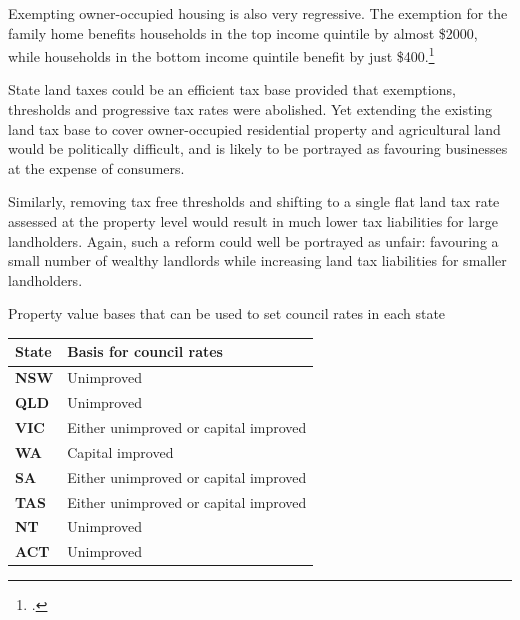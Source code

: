 \documentclass[twoside,english]{palatinob5portrait}
\begin{document}
Exempting owner-occupied housing is also very regressive. The exemption for the family home benefits households in the top income quintile by almost \$2000, while households in the bottom income quintile benefit by just \$400.\footcite[][27]{KellyMaresHarrisonEtAl2013}   

State land taxes could be an efficient tax base provided that exemptions, thresholds and progressive tax rates were abolished. Yet extending the existing land tax base to cover owner-occupied residential property and agricultural land would be politically difficult, and is likely to be portrayed as favouring businesses at the expense of consumers.

Similarly, removing tax free thresholds and shifting to a single flat land tax rate assessed at the property level would result in much lower tax liabilities for large landholders. Again, such a reform could well be portrayed as unfair: favouring a small number of wealthy landlords while increasing land tax liabilities for smaller landholders. 

\begin{table}
%
{Property value bases that can be used to set council rates in each state}
\begin{tabularx}{\columnwidth}{>{\bfseries}lX}
%
\toprule
\textbf{State} & \textbf{Basis for council rates} \\%
\midrule
\textbf{NSW} & Unimproved  \\[0.5\baselineskip]
\textbf{QLD} & Unimproved  \\[0.5\baselineskip]
\textbf{VIC} & Either unimproved or capital improved  \\[0.5\baselineskip]
\textbf{WA} & Capital improved  \\[0.5\baselineskip]
\textbf{SA} & Either unimproved or capital improved \\[0.5\baselineskip]
\textbf{TAS} & Either unimproved or capital improved  \\[0.5\baselineskip]
\textbf{NT} & Unimproved  \\[0.5\baselineskip]
\textbf{ACT} & Unimproved  \\%
\bottomrule
\end{tabularx}

\end{table}
\end{document}
